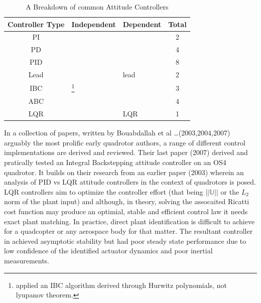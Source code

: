 \begin{table}[h]
\centering
\begin{tabular}{ |c|l|l|c| }
\hline
Controller Type & Independent & Dependent & Total\\ \hline
PI & \cite{attitudecontrolproblem} & \cite{attitudecontrolproblem} & 2\\ \hline
PD & \cite{modelingquadcopter, tiltrihani} & \cite{fullquaternion,singleaxistilting} & 4\\ \hline
PID & \cite{optimizedpidquadcopter, attitudecontrolproblem, quaddynamics, tiltpropellercontrol, pidlqr} & \cite{attitudecontrolproblem, starmac, adaptivedisturbancecontrol} & 8\\ \hline
Lead & \cite{x4flyer, dynamicmodelling2009} & lead & 2\\ \hline
IBC & \cite{tpheonix, backsteppingquadcoptercontrol}\footnote{\cite{tpheonix} applied an IBC algorithm derived through Hurwitz polynomials, not lyupanov theorem.} & \cite{backsteppingquadcoptercontrol} & 3\\ \hline
ABC & \multicolumn{2}{l|}{\cite{adaptivebackstep, nonlinearadaptive, 6dofbackstep, intelligentbackstep}} & 4\\ \hline
LQR & \cite{pidlqr} & LQR & 1\\ \hline
\end{tabular}
\caption{A Breakdown of common Attitude Controllers}
\label{tab:controllers}
\end{table}
\par
In a collection of papers, written by Bouabdallah et al \ldots (2003,2004,2007) arguably the most prolific early quadrotor authors, a range of different control implementations are derived and reviewed. Their last paper (2007)\cite{fullquadcoptercontrol} derived and pratically tested an Integral Backstepping attitude controller on an OS4 quadrotor. It builds on their research from an earlier paper (2003)\cite{pidlqr} wherein an analysis of PID vs LQR attitude controllers in the context of quadrotors is posed. LQR controllers aim to optimize the controller effort (that being $||\mathbb{U}||$ or the $L_2$ norm of the plant input) and although, in theory, solving the assocaited Ricatti cost function may produce an optimial, stable and efficient control law it needs exact plant matching. In practice, direct plant identification is difficult to achieve for a quadcopter or any aerospace body for that matter. The resultant controller in \cite{pidlqr} achieved asymptotic stability but had poor steady state performance due to low confidence of the identified actuator dynamics and poor inertial measurements.
